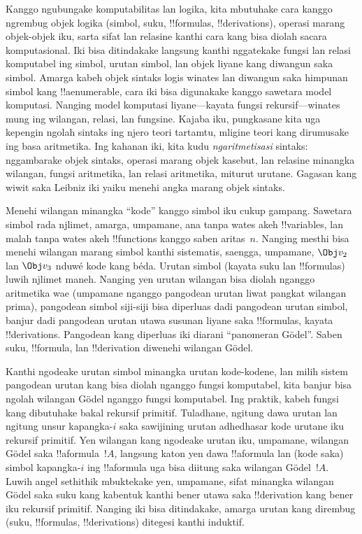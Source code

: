 \documentclass[../../../include/open-logic-section]{subfiles}
\begin{document}

Kanggo ngubungake komputabilitas lan logika,
kita mbutuhake cara kanggo ngrembug objek logika
(simbol, suku, !!{formula}s, !!{derivation}s),
operasi marang objek-objek iku, sarta sifat
lan relasine kanthi cara kang bisa diolah
sacara komputasional. Iki bisa ditindakake
langsung kanthi nggatekake fungsi lan relasi
komputabel ing simbol, urutan simbol, lan
objek liyane kang diwangun saka simbol.
Amarga kabeh objek sintaks logis winates
lan diwangun saka himpunan simbol kang
!!a{enumerable}, cara iki bisa digunakake
kanggo sawetara model komputasi. Nanging
model komputasi liyane---kayata fungsi
rekursif---winates mung ing wilangan,
relasi, lan fungsine. Kajaba iku, pungkasane
kita uga kepengin ngolah sintaks ing njero
teori tartamtu, mligine teori kang dirumusake
ing basa aritmetika. Ing kahanan iki, kita
kudu \emph{ngaritmetisasi} sintaks: nggambarake
objek sintaks, operasi marang objek kasebut,
lan relasine minangka wilangan, fungsi
aritmetika, lan relasi aritmetika,
miturut urutane. Gagasan kang wiwit saka
Leibniz iki yaiku menehi angka marang
objek sintaks.

Menehi wilangan minangka ``kode'' kanggo
simbol iku cukup gampang. Sawetara simbol
rada njlimet, amarga, umpamane, ana tanpa
wates akeh !!{variable}s, lan malah tanpa
wates akeh !!{function}s kanggo saben
aritas~$n$. Nanging mesthi bisa menehi
wilangan marang simbol kanthi sistematis,
saengga, umpamane, $\Obj v_2$ lan
$\Obj v_3$ nduwé kode kang béda. Urutan
simbol (kayata suku lan !!{formula}s)
luwih njlimet maneh. Nanging yen urutan
wilangan bisa diolah nganggo aritmetika
wae (umpamane nganggo pangodean urutan
liwat pangkat wilangan prima), pangodean
simbol siji-siji bisa diperluas dadi
pangodean urutan simbol, banjur dadi
pangodean urutan utawa susunan liyane
saka !!{formula}s, kayata !!{derivation}s.
Pangodean kang diperluas iki diarani
``panomeran G\"odel''. Saben suku,
!!{formula}, lan !!{derivation} diwenehi
wilangan G\"odel.

Kanthi ngodeake urutan simbol minangka
urutan kode-kodene, lan milih sistem
pangodean urutan kang bisa diolah nganggo
fungsi komputabel, kita banjur bisa ngolah
wilangan G\"odel nganggo fungsi komputabel.
Ing praktik, kabeh fungsi kang dibutuhake
bakal rekursif primitif. Tuladhane,
ngitung dawa urutan lan ngitung unsur
kapangka-$i$ saka sawijining urutan adhedhasar
kode urutane iku rekursif primitif.
Yen wilangan kang ngodeake urutan iku,
umpamane, wilangan G\"odel saka
!!a{formula}~$!A$, langsung katon yen
dawa !!a{formula} lan (kode saka) simbol
kapangka-$i$ ing !!a{formula} uga bisa
diitung saka wilangan G\"odel~$!A$.
Luwih angel sethithik mbuktekake yen,
umpamane, sifat minangka wilangan G\"odel
saka suku kang kabentuk kanthi bener utawa
saka !!{derivation} kang bener iku rekursif
primitif. Nanging iki bisa ditindakake,
amarga urutan kang dirembug (suku,
!!{formula}s, !!{derivation}s)
ditegesi kanthi induktif.
\end{document}
